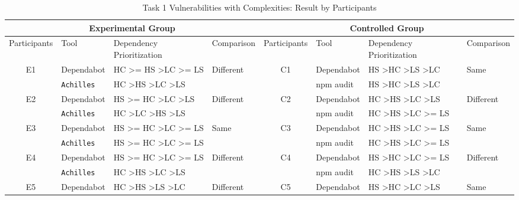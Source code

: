 \documentclass[conference]{IEEEtran}
\begin{document}
	\begin{table}
		\caption{Task 1 Vulnerabilities with Complexities: Result by Participants}
		\centering
		\begin{tabular}{clll|clll}
			\toprule
			\multicolumn{4}{c|}{Experimental Group} & \multicolumn{4}{c}{Controlled Group}  \\ 
			\midrule
			Participants         & Tool       & Dependency Prioritization & Comparison & Participants & Tool  & Dependency Prioritization & Comparison \\ 
			\midrule
			\multirow{2}{*}{E1}   & Dependabot    & HC \textgreater{}= HS \textgreater LC \textgreater{}= LS & \multirow{2}{*}{Different} & \multirow{2}{*}{C1} & Dependabot & HS \textgreater HC \textgreater LS \textgreater LC & \multirow{2}{*}{Same} \\ 
			& \texttt{Achilles}      & HC \textgreater HS \textgreater LC \textgreater LS       & & & npm audit & HS \textgreater HC \textgreater LS \textgreater LC & \\ \midrule
			\multirow{2}{*}{E2}   & Dependabot    & HS \textgreater{}= HC \textgreater LC \textgreater LS    & \multirow{2}{*}{Different} & \multirow{2}{*}{C2} & Dependabot & HC \textgreater HS \textgreater LC \textgreater LS & \multirow{2}{*}{Different} \\ 
			& \texttt{Achilles}      & HC \textgreater LC \textgreater HS \textgreater LS       & & & npm audit & HC \textgreater HS \textgreater LC \textgreater{}= LS & \\ \midrule
			\multirow{2}{*}{E3}   & Dependabot    & HS \textgreater{}= HC \textgreater LC \textgreater{}= LS & \multirow{2}{*}{Same} & \multirow{2}{*}{C3} & Dependabot & HC \textgreater HS \textgreater LC \textgreater{}= LS & \multirow{2}{*}{Same} \\ 
			& \texttt{Achilles}      & HS \textgreater{}= HC \textgreater LC \textgreater{}= LS & & & npm audit & HC \textgreater HS \textgreater LC \textgreater{}= LS & \\ \midrule
			\multirow{2}{*}{E4}   & Dependabot    & HS \textgreater{}= HC \textgreater LC \textgreater{}= LS & \multirow{2}{*}{Different} & \multirow{2}{*}{C4} & Dependabot & HS \textgreater HC \textgreater LC \textgreater{}= LS  & \multirow{2}{*}{Different} \\ 
			& \texttt{Achilles}      & HC \textgreater HS \textgreater LC \textgreater LS       & & & npm audit & HC \textgreater HS \textgreater LS \textgreater LC & \\ \midrule
			\multirow{2}{*}{E5}   & Dependabot    & HC \textgreater HS \textgreater LS \textgreater LC       & \multirow{2}{*}{Different} & \multirow{2}{*}{C5} & Dependabot & HS \textgreater HC \textgreater LC \textgreater LS & \multirow{2}{*}{Same} \\ 

\end{tabular}
\end{table}
\end{document}
